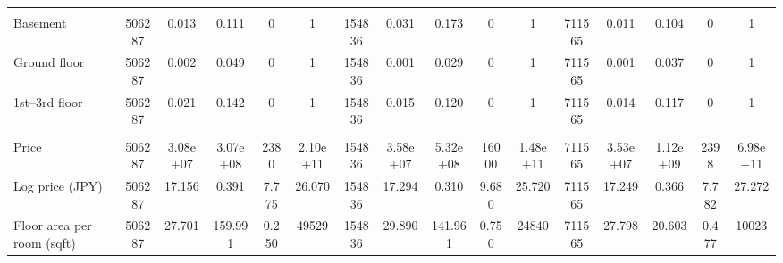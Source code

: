 \begin{table}[htbp]
\begin{tabular}{l*{3}{ccccc}}
\addlinespace[4pt]
\multicolumn{16}{l}{\quad \textit{Floor Group}}\\

Basement
&506287&0.013&0.111&0&1
&154836&0.031&0.173&0&1
&711565&0.011&0.104&0&1\\

Ground floor
&506287&0.002&0.049&0&1
&154836&0.001&0.029&0&1
&711565&0.001&0.037&0&1\\

1st--3rd floor
&506287&0.021&0.142&0&1
&154836&0.015&0.120&0&1
&711565&0.014&0.117&0&1\\


\addlinespace[6pt]

\multicolumn{16}{l}{\textit{Panel B. Price and Size}}\\

Price
&506287&3.08e+07&3.07e+08&2380&2.10e+11
&154836&3.58e+07&5.32e+08&16000&1.48e+11
&711565&3.53e+07&1.12e+09&2398&6.98e+11\\

Log price (JPY)
&506287&17.156&0.391&7.775&26.070
&154836&17.294&0.310&9.680&25.720
&711565&17.249&0.366&7.782&27.272\\

Floor area per room (sqft)
&506287&27.701&159.991&0.250&49529
&154836&29.890&141.961&0.750&24840
&711565&27.798&20.603&0.477&10023\\


\bottomrule
\end{tabular}

\end{table}